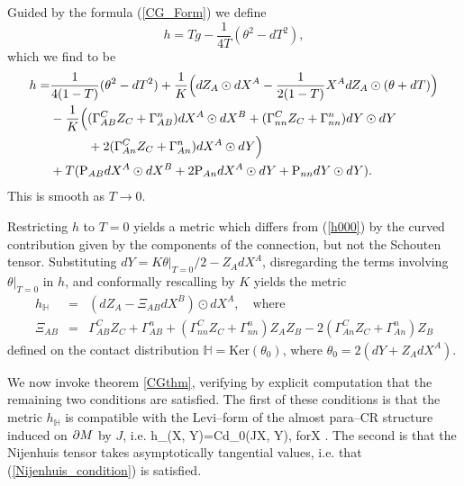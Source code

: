 Guided by the formula (\ref{CG_Form}) we define
\[
h=Tg-\frac{1}{4T}(\theta^2-dT^2),
\]
which we find to be
\begin{equation*}
\begin{split}
h=&
\frac{1}{4(1-T)}(\theta^2-dT^2)+\frac{1}{K}\Big(dZ_A\odot dX^A-\frac{1}{2(1-T)}
X^A dZ_A\odot (\theta+dT)\Big)\\
&-\frac{1}{K}\Big(
(\Gamma_{AB}^CZ_C+\Gamma_{AB}^n)dX^A\odot dX^B+
(\Gamma_{nn}^CZ_C+\Gamma_{nn}^n)dY\odot dY \\
&\qquad\quad + 2(\Gamma_{An}^CZ_C+\Gamma_{An}^n)dX^A\odot dY\Big)\\
&+T(\mathrm{P}_{AB}dX^A\odot dX^B+2\mathrm{P}_{An}dX^A\odot dY+\mathrm{P}_{nn}dY\odot dY).
\end{split}
\end{equation*}
This is  smooth as $T\rightarrow 0$.

Restricting $h$ to $T=0$ yields a metric which differs from
(\ref{h000}) by the curved contribution given by the components of the  connection, but not the Schouten tensor. Substituting $dY=K\theta|_{T=0}/2-Z_AdX^A$, disregarding the terms involving $\theta|_{T=0}$ in $h$, and conformally rescalling by 
$K$ yields the metric
\begin{eqnarray}
\label{met_th}
h_{ \mathbb{H} }&=&(dZ_A-\Xi_{AB}dX^B)\odot dX^A,\quad
\mbox{where}\\
\Xi_{AB}&=&\Gamma_{AB}^CZ_C+\Gamma_{AB}^n+
(\Gamma_{nn}^CZ_C+\Gamma_{nn}^n)Z_AZ_B-
2(\Gamma_{An}^CZ_C+\Gamma_{An}^n)Z_B\nonumber
\end{eqnarray}
defined on the contact distribution ${ \mathbb{H} }=\mbox{Ker}(\theta_0)$, 
where $\theta_0=2(dY+Z_AdX^A)$.

We now invoke theorem \ref{CGthm},  verifying
by explicit computation that the remaining two conditions are satisfied. The first of these conditions is that the metric $h_{ \mathbb{H} }$ is compatible with the Levi--form of the almost para--CR structure induced on $\partial M$ by $J$, i.e.
\be
\label{boundary_compatibility}
h_(X, Y)=Cd\theta_0(JX, Y), \quad\mbox{for}\quad X\in {} .
\ee
{}
The second is that the Nijenhuis tensor takes asymptotically tangential values, i.e. that (\ref{Nijenhuis_condition}) is satisfied.

